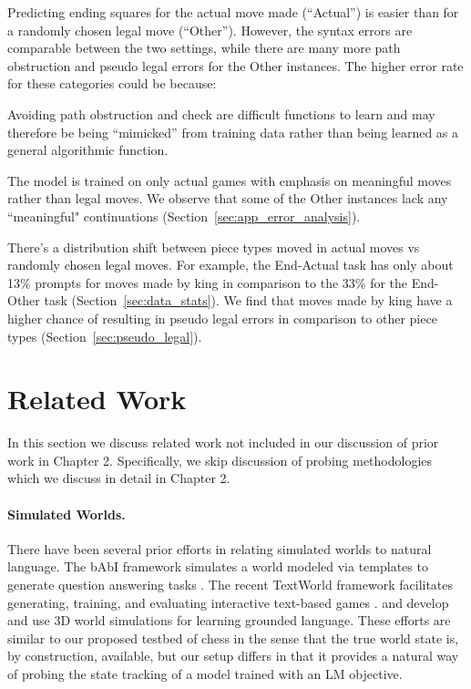 \documentclass[12pt]{thesis-umich}[thesis]
\newenvironment{itemizesquish}{\begin{list}{\setcounter{enumi}{0}\labelitemi}{\setlength{\itemsep}{-0.25em}\setlength{\labelwidth}{0.5em}\setlength{\leftmargin}{\labelwidth}\addtolength{\leftmargin}{\labelsep}}}{\end{list}}
\begin{document}
Predicting ending squares for the actual move made (``Actual'') is easier than for a randomly chosen legal move (``Other''). However, the syntax errors are comparable between the two settings, while there are many more path obstruction and pseudo legal errors for the Other instances. 
	The higher error rate for these categories could be because:
	\begin{itemizesquish}
		\item Avoiding path obstruction and check are difficult functions to learn and may therefore be being ``mimicked'' from training data rather than being learned as a general algorithmic function.
		\item The model is trained on only actual games with emphasis on meaningful moves rather than legal moves. We observe that some of the Other instances lack any ``meaningful" continuations (Section~\ref{sec:app_error_analysis}).
		\item There's a distribution shift between piece types moved in actual moves vs randomly chosen legal moves. 
		For example, the End-Actual task has only about 13\% prompts for moves made by king in comparison to the 33\% for the End-Other task (Section~\ref{sec:data_stats}).  We find that moves made by king have a higher chance of resulting in pseudo legal errors in comparison to other piece types (Section~\ref{sec:pseudo_legal}).  
	\end{itemizesquish} 














 \section{Related Work}

In this section we discuss related work not included in our discussion of prior work in Chapter 2. Specifically, we skip discussion of probing methodologies which we discuss in detail in Chapter 2. 

\paragraph{Simulated Worlds.} There have been several prior efforts in relating simulated worlds to natural language. 
The bAbI framework simulates a world modeled via templates to generate question answering tasks \citep{weston2015aicomplete}. 
The recent TextWorld framework facilitates generating, training, and evaluating interactive text-based games \citep{cote18textworld}. 
\citet{hermann17grounded} and \citet{hill17understanding} develop and use 3D world simulations for learning grounded language.
These efforts are similar to our proposed testbed of chess in the sense that the true world state is, by construction, available, but our setup differs in that it provides a natural way of probing the state tracking of a model trained with an LM objective.
\end{document}
